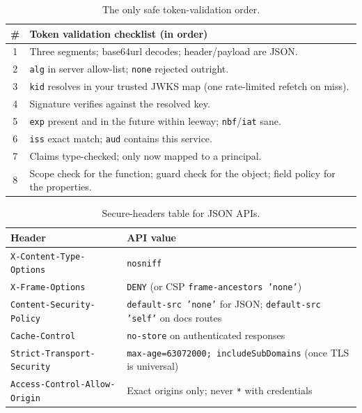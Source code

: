 \begin{table}[ht]
\centering\small
\begin{tabularx}{\textwidth}{c X}
\toprule
\textbf{\#} & \textbf{Token validation checklist (in order)} \\
\midrule
1 & Three segments; base64url decodes; header/payload are JSON. \\
2 & \texttt{alg} in server allow-list; \texttt{none} rejected outright. \\
3 & \texttt{kid} resolves in your trusted JWKS map (one rate-limited refetch on miss). \\
4 & Signature verifies against the resolved key. \\
5 & \texttt{exp} present and in the future within leeway; \texttt{nbf}/\texttt{iat} sane. \\
6 & \texttt{iss} exact match; \texttt{aud} contains this service. \\
7 & Claims type-checked; only now mapped to a principal. \\
8 & Scope check for the function; guard check for the object; field policy for the properties. \\
\bottomrule
\end{tabularx}
\caption{The only safe token-validation order.}
\label{tab:ch16-tokencheck}
\end{table}

\begin{table}[ht]
\centering\small
\begin{tabularx}{\textwidth}{l X}
\toprule
\textbf{Header} & \textbf{API value} \\
\midrule
\texttt{X-Content-Type-Options} & \texttt{nosniff} \\
\texttt{X-Frame-Options} & \texttt{DENY} (or CSP \texttt{frame-ancestors 'none'}) \\
\texttt{Content-Security-Policy} & \texttt{default-src 'none'} for JSON; \texttt{default-src 'self'} on docs routes \\
\texttt{Cache-Control} & \texttt{no-store} on authenticated responses \\
\texttt{Strict-Transport-Security} & \texttt{max-age=63072000; includeSubDomains} (once TLS is universal) \\
\texttt{Access-Control-Allow-Origin} & Exact origins only; never \texttt{*} with credentials \\
\bottomrule
\end{tabularx}
\caption{Secure-headers table for JSON APIs.}
\label{tab:ch16-headers}
\end{table}



